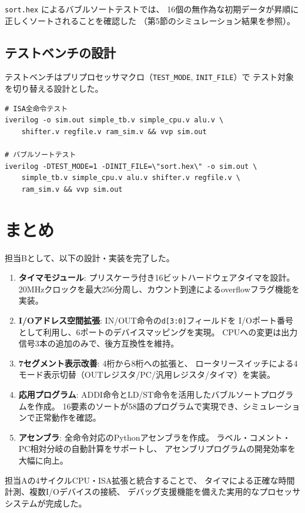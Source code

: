 \documentclass[a4paper,11pt]{ltjsarticle}
\begin{document}
\texttt{sort.hex} によるバブルソートテストでは、
16個の無作為な初期データが昇順に正しくソートされることを確認した
（第5節のシミュレーション結果を参照）。

\subsection{テストベンチの設計}

テストベンチはプリプロセッサマクロ（\texttt{TEST\_MODE}, \texttt{INIT\_FILE}）で
テスト対象を切り替える設計とした。

\begin{lstlisting}[language={},caption={テストの実行コマンド}]
# ISA全命令テスト
iverilog -o sim.out simple_tb.v simple_cpu.v alu.v \
    shifter.v regfile.v ram_sim.v && vvp sim.out

# バブルソートテスト
iverilog -DTEST_MODE=1 -DINIT_FILE=\"sort.hex\" -o sim.out \
    simple_tb.v simple_cpu.v alu.v shifter.v regfile.v \
    ram_sim.v && vvp sim.out
\end{lstlisting}


\section{まとめ}

担当Bとして、以下の設計・実装を完了した。

\begin{enumerate}
\item \textbf{タイマモジュール}: プリスケーラ付き16ビットハードウェアタイマを設計。
  20MHzクロックを最大256分周し、カウント到達によるoverflowフラグ機能を実装。

\item \textbf{I/Oアドレス空間拡張}: IN/OUT命令の\texttt{d[3:0]}フィールドを
  I/Oポート番号として利用し、6ポートのデバイスマッピングを実現。
  CPUへの変更は出力信号3本の追加のみで、後方互換性を維持。

\item \textbf{7セグメント表示改善}: 4桁から8桁への拡張と、
  ロータリースイッチによる4モード表示切替（OUTレジスタ/PC/汎用レジスタ/タイマ）を実装。

\item \textbf{応用プログラム}: ADDI命令とLD/ST命令を活用したバブルソートプログラムを作成。
  16要素のソートが58語のプログラムで実現でき、シミュレーションで正常動作を確認。

\item \textbf{アセンブラ}: 全命令対応のPythonアセンブラを作成。
  ラベル・コメント・PC相対分岐の自動計算をサポートし、
  アセンブリプログラムの開発効率を大幅に向上。
\end{enumerate}

担当Aの4サイクルCPU・ISA拡張と統合することで、
タイマによる正確な時間計測、複数I/Oデバイスの接続、
デバッグ支援機能を備えた実用的なプロセッサシステムが完成した。
\end{document}

